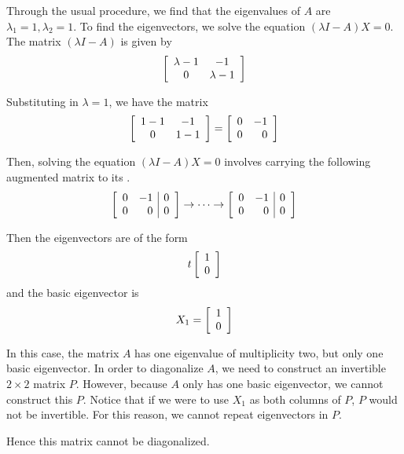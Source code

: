 \begin{solution}
Through the usual procedure, we find that the eigenvalues of $A$ are $\lambda_1 =1, \lambda_2=1.$ 
To find the eigenvectors, we solve the equation $\left(\lambda I - A \right) X = 0$.
The matrix $\left(\lambda I -A \right)$ is given by 
\begin{equation*}
\left[
\begin{array}{cc}
\lambda - 1 & -1 \\
0 & \lambda - 1
\end{array}
\right]
\end{equation*}

Substituting in $\lambda = 1$, we have the matrix
\begin{equation*}
\left[
\begin{array}{cc}
1 - 1 & -1 \\
0 & 1 - 1
\end{array}
\right]
=
\left[
\begin{array}{rr}
0 & -1 \\
0 & 0
\end{array}
\right]
\end{equation*}

Then, solving the equation $\left(\lambda I - A\right) X = 0$ 
involves carrying the following augmented matrix to its {\rref}. 
\begin{equation*}
\left[
\begin{array}{rr|r}
0 & -1 & 0 \\
0 & 0 & 0
\end{array}
\right] 
\rightarrow \cdots \rightarrow
\left[
\begin{array}{rr|r}
0 & -1 & 0 \\
0 & 0 & 0
\end{array}
\right] 
\end{equation*}

Then the eigenvectors are of the form
\begin{equation*}
t\left[
\begin{array}{r}
1 \\
0
\end{array}
\right]
\end{equation*}
and the basic eigenvector is 
\begin{equation*}
X_1
=
\left[
\begin{array}{r}
1 \\
0
\end{array}
\right]
\end{equation*}

In this case, the matrix $A$ has one eigenvalue of multiplicity two, 
but only one basic eigenvector. In order to diagonalize $A$, we need to construct
an invertible $2\times 2$ matrix $P$. However, because $A$ only has one basic eigenvector,
we cannot construct this $P$. Notice that if we were to use $X_1$ as both columns of $P$, $P$ would not be invertible. For this reason, we cannot repeat eigenvectors in $P$.

Hence this matrix cannot be diagonalized. 
\end{solution}

